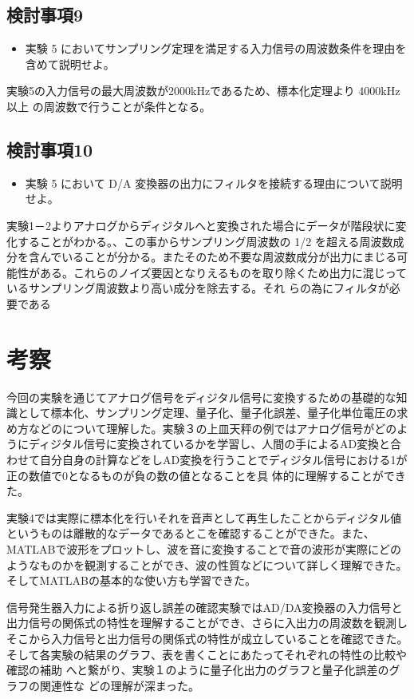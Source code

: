 \documentclass[10pt]{article}
\begin{document}
\subsection{検討事項9}
\begin{itemize}
    \item 実験 5 においてサンプリング定理を満足する入力信号の周波数条件を理由を含めて説明せよ。 
\end{itemize}
\large
実験5の入力信号の最大周波数が2000kHzであるため、標本化定理より 4000kHz 以上 の周波数で行うことが条件となる。

\subsection{検討事項10}
\begin{itemize}
    \item  実験 5 において D/A 変換器の出力にフィルタを接続する理由について説明せよ。 
\end{itemize}
\large
実験1－2よりアナログからディジタルへと変換された場合にデータが階段状に変化することがわかる。、この事からサンプリング周波数の 1/2 を超える周波数成分を含んでいることが分かる。またそのため不要な周波数成分が出力にまじる可能性がある。これらのノイズ要因となりえるものを取り除くため出力に混じっているサンプリング周波数より高い成分を除去する。それ らの為にフィルタが必要である

\section{考察}
\large
今回の実験を通じてアナログ信号をディジタル信号に変換するための基礎的な知識として標本化、サンプリング定理、量子化、量子化誤差、量子化単位電圧の求め方などのについて理解した。実験３の上皿天秤の例ではアナログ信号がどのようにディジタル信号に変換されているかを学習し、人間の手によるAD変換と合わせて自分自身の計算などをしAD変換を行うことでディジタル信号における1が正の数値で0となるものが負の数の値となることを具
体的に理解することができた。

実験4では実際に標本化を行いそれを音声として再生したことからディジタル値というものは離散的なデータであるとこを確認することができた。また、MATLABで波形をプロットし、波を音に変換することで音の波形が実際にどのようなものかを観測することができ、波の性質などについて詳しく理解できた。そしてMATLABの基本的な使い方も学習できた。

信号発生器入力による折り返し誤差の確認実験ではAD/DA変換器の入力信号と
出力信号の関係式の特性を理解することができ、さらに入出力の周波数を観測し
そこから入力信号と出力信号の関係式の特性が成立していることを確認できた。
そして各実験の結果のグラフ、表を書くことにあたってそれぞれの特性の比較や確認の補助
へと繋がり、実験１のように量子化出力のグラフと量子化誤差のグラフの関連性な
どの理解が深まった。
\end{document}
